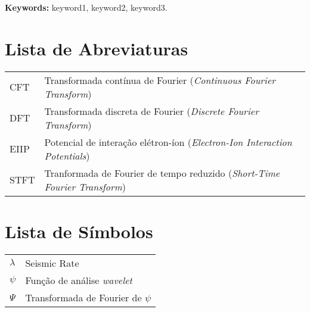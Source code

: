 \documentclass[12pt,twoside,a4paper]{book}
\begin{document}
\noindent \textbf{Keywords:} keyword1, keyword2, keyword3.

\tableofcontents    %

\chapter{Lista de Abreviaturas}
\begin{tabular}{ll}
         CFT         & Transformada contínua de Fourier (\emph{Continuous Fourier Transform})\\
         DFT         & Transformada discreta de Fourier (\emph{Discrete Fourier Transform})\\
        EIIP         & Potencial de interação elétron-íon (\emph{Electron-Ion Interaction Potentials})\\
        STFT         & Tranformada de Fourier de tempo reduzido (\emph{Short-Time Fourier Transform})\\
\end{tabular}

\chapter{Lista de Símbolos}
\begin{tabular}{ll}
        $\lambda$    & Seismic Rate\\
        $\psi$      & Função de análise \emph{wavelet}\\
        $\Psi$      & Transformada de Fourier de $\psi$\\
\end{tabular}

\listoffigures            
\listoftables            

\mainmatter

\fancyhead[RE,LO]{\thesection}

\singlespacing              %
\end{document}
